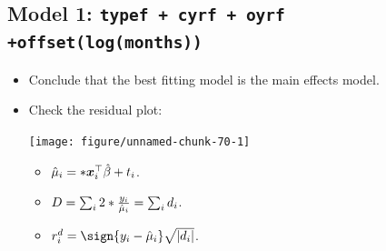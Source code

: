 \documentclass{article}\usepackage[]{graphicx}\usepackage[svgnames]{xcolor}
\newenvironment{knitrout}{}{} %
\let\exp\relax%
\let\log\relax%
\DeclarePairedDelimiter\abs{\lvert}{\rvert}
\providecommand{\Vector}[1]{\bm{#1}}%
\begin{document}
\subsection*{Model 1: \texttt{typef + cyrf + oyrf +offset(log(months))}}
\begin{itemize}
    \item Conclude that the best fitting model is the main effects model.
    \item Check the residual plot:
\begin{knitrout}
\color{fgcolor}

{\centering \texttt{[image: figure/unnamed-chunk-70-1]} 

}


\end{knitrout}
          \begin{itemize}
              \item $ \hat{\mu}_i=\exp*{\Vector{x}_i^\top \hat{\beta}+\log{t_i}} $.
              \item $ D=\sum_{i}2\log*{\frac{y_i}{\hat{\mu}_i}}=\sum_i d_i $.
              \item $ r_i^d=\sign{y_i-\hat{\mu}_i}\sqrt{\abs{d_i}} $.
          \end{itemize}
\end{itemize}
\end{document}
